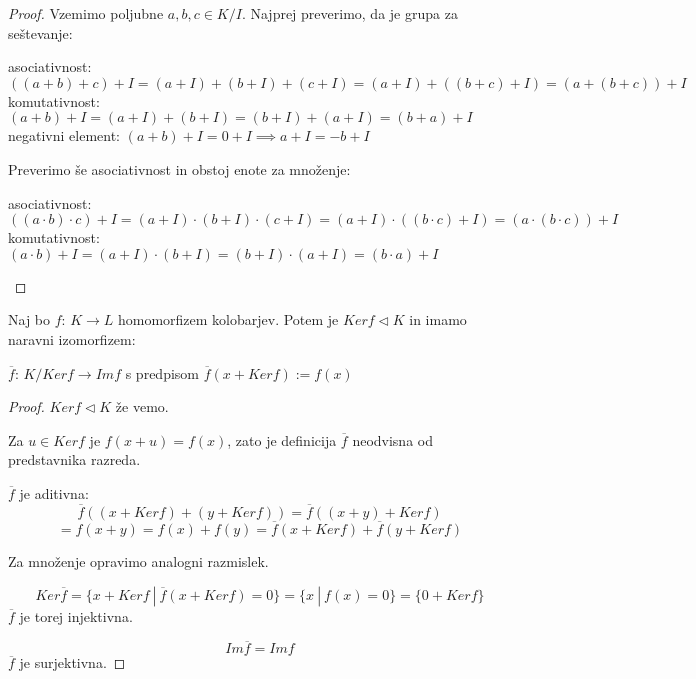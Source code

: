 \documentclass[11pt, a4paper]{article}
\begin{document}
    \begin{proof}
        Vzemimo poljubne \(a,b,c \in K / I\). Najprej preverimo, da je grupa za seštevanje:
        \begin{center}
            asociativnost: \(((a+b) + c) + I = (a+I) + (b+I) + (c+I) = (a+I) + ((b+c) + I) = (a + (b+c)) + I\) \\
            komutativnost: \((a+b) + I = (a+I) + (b+I) = (b+I) + (a+I) = (b+a) + I\) \\
            negativni element: \((a+b) + I = 0 + I \implies a + I = -b + I\)
        \end{center} 

        Preverimo še asociativnost in obstoj enote za množenje:
        \begin{center}
            asociativnost: \(((a \cdot b) \cdot c) + I = (a+I) \cdot (b+I) \cdot (c+I) = (a+I) \cdot ((b \cdot c) + I) = (a \cdot (b \cdot c)) + I\) \\
            komutativnost: \((a \cdot b) + I = (a+I) \cdot (b+I) = (b+I) \cdot (a+I) = (b \cdot a) + I\) \\
        \end{center}
    \end{proof}

    \begin{theorem}
        Naj bo \(f\): \(K \to L\) homomorfizem kolobarjev. Potem je \(Ker f \triangleleft K\) in imamo naravni izomorfizem:
        \begin{center}
            \(\overline{f}\): \(K / Ker f \to Im f\) s predpisom \(\overline{f}(x + Ker f) := f(x)\)
        \end{center}
    \end{theorem}

    \begin{proof}
        \(Ker f \triangleleft K\) že vemo.
        \par
        Za \(u \in Ker f\) je \(f(x+u)=f(x)\), zato je definicija \(\overline{f}\) neodvisna od predstavnika razreda.
        \par
        \(\overline{f}\) je aditivna:
        \[\overline{f}((x + Ker f) + (y + Ker f)) = \overline{f}((x+y) + Ker f)\] \[= f(x+y) = f(x) + f(y) = \overline{f}(x + Ker f) + \overline{f}(y + Ker f)\]

        Za množenje opravimo analogni razmislek.

        \[Ker \overline{f} = \{x + Ker f\ |\ \overline{f}(x + Ker f) = 0 \} = \{x\ |\ f(x) = 0\} = \{0 + Ker f\}\]
        \(\overline{f}\) je torej injektivna.

        \[Im \overline{f} = Im f\]
        \(\overline{f}\) je surjektivna.
    \end{proof}
\end{document}
